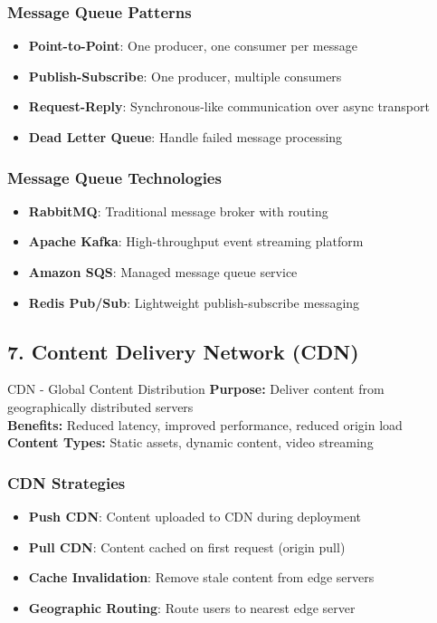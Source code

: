 \documentclass[10pt,a4paper]{article}
\begin{document}
\subsubsection{Message Queue Patterns}
\begin{itemize}
\item \textbf{Point-to-Point}: One producer, one consumer per message
\item \textbf{Publish-Subscribe}: One producer, multiple consumers
\item \textbf{Request-Reply}: Synchronous-like communication over async transport
\item \textbf{Dead Letter Queue}: Handle failed message processing
\end{itemize}

\subsubsection{Message Queue Technologies}
\begin{itemize}
\item \textbf{RabbitMQ}: Traditional message broker with routing
\item \textbf{Apache Kafka}: High-throughput event streaming platform
\item \textbf{Amazon SQS}: Managed message queue service
\item \textbf{Redis Pub/Sub}: Lightweight publish-subscribe messaging
\end{itemize}

\subsection{7. Content Delivery Network (CDN)}

\begin{conceptbox}{CDN - Global Content Distribution}
\textbf{Purpose:} Deliver content from geographically distributed servers\\
\textbf{Benefits:} Reduced latency, improved performance, reduced origin load\\
\textbf{Content Types:} Static assets, dynamic content, video streaming
\end{conceptbox}

\subsubsection{CDN Strategies}
\begin{itemize}
\item \textbf{Push CDN}: Content uploaded to CDN during deployment
\item \textbf{Pull CDN}: Content cached on first request (origin pull)
\item \textbf{Cache Invalidation}: Remove stale content from edge servers
\item \textbf{Geographic Routing}: Route users to nearest edge server
\end{itemize}
\end{document}
